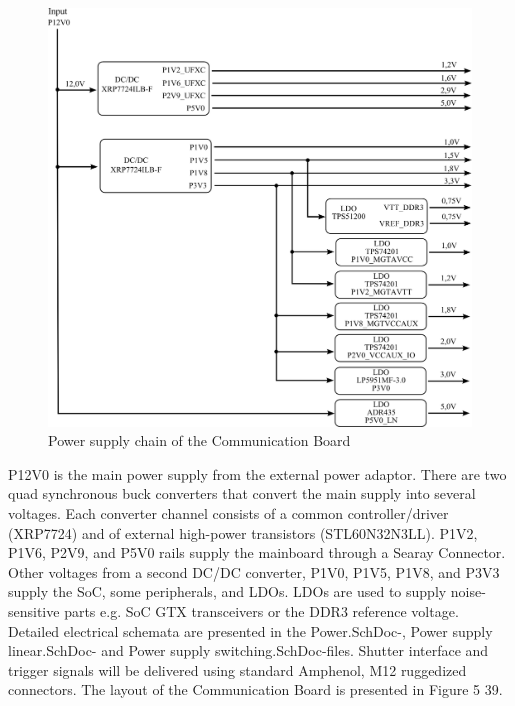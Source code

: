 \begin{figure}[H]
\centering
\includegraphics[width=\textwidth]{pict/power_supply.png}
\caption{Power supply chain of the Communication Board}
\label{fig:powersup}
\end{figure}


P12V0 is the main power supply from the external power adaptor. There are two quad synchronous buck converters that convert the main supply into several voltages. Each converter channel consists of a common controller/driver (XRP7724) and of external high-power transistors (STL60N32N3LL). P1V2, P1V6, P2V9, and P5V0 rails supply the mainboard through a Searay Connector. Other voltages from a second DC/DC converter, P1V0, P1V5, P1V8, and P3V3 supply the SoC, some peripherals, and LDOs. LDOs are used to supply noise-sensitive parts e.g. SoC GTX transceivers or the DDR3 reference voltage. 
Detailed electrical schemata are presented in the Power.SchDoc-, Power supply linear.SchDoc- and Power supply switching.SchDoc-files. 
Shutter interface and trigger signals will be delivered using standard Amphenol, M12 ruggedized connectors.
The layout of the Communication Board is presented in Figure 5 39.

